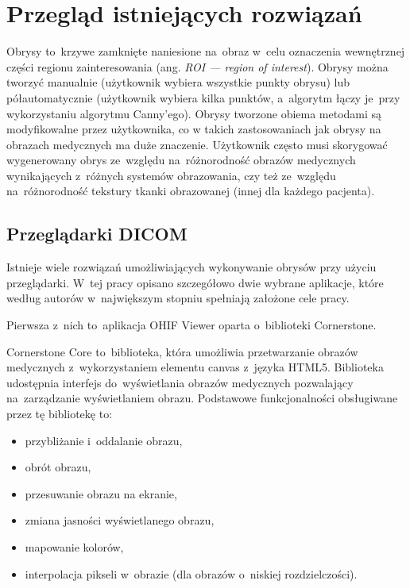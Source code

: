 \documentclass[a4paper,11pt,twoside,openright]{report}
\theoremstyle{definition}
\begin{document}
\section {Przegląd istniejących rozwiązań}

Obrysy to~krzywe zamknięte naniesione na~obraz w~celu oznaczenia wewnętrznej części
regionu zainteresowania (ang. \textit{ROI --- region of interest}).
Obrysy można tworzyć manualnie (użytkownik wybiera wszystkie punkty obrysu) lub
półautomatycznie (użytkownik wybiera kilka punktów, a~algorytm łączy je~przy wykorzystaniu
algorytmu Canny'ego). Obrysy tworzone obiema metodami są modyfikowalne przez użytkownika,
co w takich zastosowaniach jak obrysy na obrazach medycznych ma duże znaczenie. Użytkownik często musi skorygować
wygenerowany obrys ze~względu na~różnorodność obrazów medycznych wynikających z~różnych systemów
obrazowania, czy też ze~względu na~różnorodność tekstury tkanki obrazowanej (innej dla każdego pacjenta).

\subsection {Przeglądarki DICOM}

Istnieje wiele rozwiązań umożliwiających wykonywanie obrysów przy użyciu przeglądarki.
W~tej pracy opisano szczegółowo dwie wybrane aplikacje, które według autorów w~największym
stopniu spełniają założone cele pracy.

Pierwsza z~nich to~aplikacja OHIF Viewer \cite{OHIF Viewer} oparta o~biblioteki Cornerstone.

Cornerstone Core \cite{Cornerstone Core} to~biblioteka, która umożliwia przetwarzanie
obrazów medycznych z~wykorzystaniem elementu canvas z~języka HTML5. Biblioteka
udostępnia interfejs do~wyświetlania obrazów medycznych pozwalający na~zarządzanie
wyświetlaniem obrazu. Podstawowe funkcjonalności obsługiwane przez tę bibliotekę to:

\begin{itemize}[noitemsep]
\item przybliżanie i~oddalanie obrazu,
\item obrót obrazu,
\item przesuwanie obrazu na ekranie,
\item zmiana jasności wyświetlanego obrazu,
\item mapowanie kolorów,
\item interpolacja pikseli w~obrazie (dla obrazów o~niskiej rozdzielczości).
\end{itemize}
\end{document}
